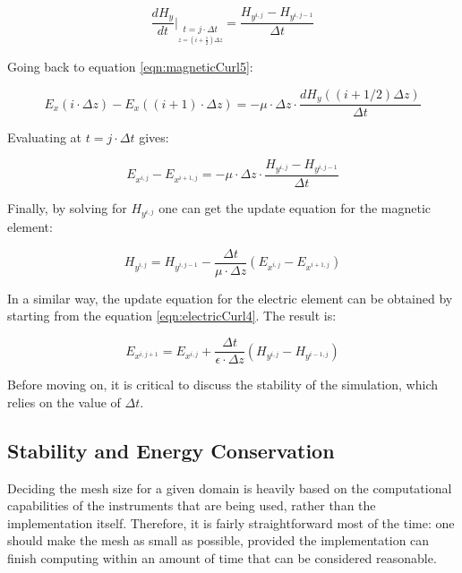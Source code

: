 \begin{equation}
	\label{eqn:timeDerivativeH}
	\frac{d H_y}{dt} \bigg\rvert_{\underset{z = (i + \frac{1}{2}) \Delta z}{t=j \cdot \Delta t}} = \frac{H_{y^{i,j}} - H_{y^{i,j-1}}}{\Delta t}
\end{equation}

Going back to equation \ref{eqn:magneticCurl5}:

\begin{equation}
	\label{eqn:timeDerivativeE2}
	E_x(i \cdot \Delta z) - E_x((i+1) \cdot \Delta z) = -\mu \cdot \Delta z \cdot \frac{d H_y((i+1/2)\Delta z) }{\Delta t}
\end{equation}

Evaluating at $t = j \cdot \Delta t$ gives:

\begin{equation}
	\label{eqn:timeDerivativeE3}
	E_{x^{i,j}} - E_{x^{i+1,j}} = -\mu \cdot \Delta z \cdot \frac{H_{y^{i,j}} - H_{y^{i,j-1}}}{\Delta t}
\end{equation}

Finally, by solving for ${H_{y^{i,j}}}$ one can get the update equation for the magnetic element:
	
\begin{equation}
	\label{eqn:magneticUpdate}
	H_{y^{i,j}} = H_{y^{i,j-1}} - \frac{\Delta t}{\mu \cdot \Delta z}(E_{x^{i,j}} - E_{x^{i+1,j}})
\end{equation}

In a similar way, the update equation for the electric element can be obtained by starting from the equation \ref{eqn:electricCurl4}. The result is:

\begin{equation}
	\label{eqn:electricUpdate}
	E_{x^{i,j+1}} = E_{x^{i,j}} + \frac{\Delta t}{\epsilon \cdot \Delta z}(H_{y^{i,j}} -  H_{y^{i-1,j}})
\end{equation}

Before moving on, it is critical to discuss the stability of the simulation, which relies on the value of $\Delta t$.

\subsection{Stability and Energy Conservation}\label{sec:stability}
Deciding the mesh size for a given domain is heavily based on the computational capabilities of the instruments that are being used, rather than the implementation itself. Therefore, it is fairly straightforward most of the time: one should make the mesh as small as possible, provided the implementation can finish computing within an amount of time that can be considered reasonable.

